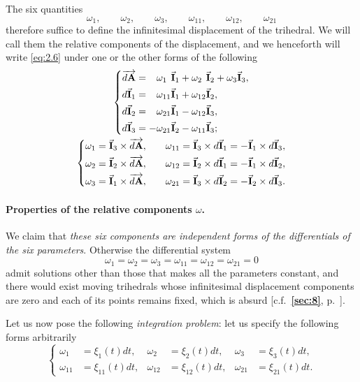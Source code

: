 \documentclass[leqno,11pt]{book}
\numberwithin{equation}{chapter}
\theoremstyle{shape1}
\theoremstyle{shapesmall}
\newcommand{\fsref}[1]{{\rm\textsection\textbf{\ref{sec:#1}}}}
\newcommand{\rvec}[1]{\vec{\mathbf{#1}}}
\newcommand{\ivec}{\rvec{I}}
\begin{document}
The six quantities
\[
\omega_{1},\qquad\omega_{2},\qquad\omega_{3},\qquad\omega_{11},\qquad\omega_{12},\qquad\omega_{21}
\]
therefore suffice to define the infinitesimal displacement of the trihedral. We will call them the relative components of the displacement, and we henceforth will write \eqref{eq:2.6} under one or the other forms of the following
\begin{gather}
  \label{eq:2.7}
  \left\{
    \begin{aligned}
      \overrightarrow{d\mathbf{A}}&={}\hphantom{+}\omega_{1\hphantom{0}}\ivec_{1}+\omega_{2\hphantom{0}}\ivec_{2}+\omega_{3}\ivec_{3},\\
      d\ivec_{1}&={}\hphantom{+}\omega_{11}\ivec_{1}+\omega_{12}\ivec_{2},\\
      d\ivec_{2}&={}\hphantom{+}\omega_{21}\ivec_{1}-\omega_{12}\ivec_{3},\\
      d\ivec_{3}&=-\omega_{21}\ivec_{2}-\omega_{11}\ivec_{3};
    \end{aligned}
  \right.  \\
  \label{eq:2.8}
  \left\{
    \begin{aligned}
      \omega_{1}&=\ivec_{3}\times\overrightarrow{d\mathbf{A}},&&&\omega_{11}&=\ivec_{3}\times d\ivec_{1}=-\ivec_{1}\times d\ivec_{3},\\
      \omega_{2}&=\ivec_{2}\times\overrightarrow{d\mathbf{A}},&&&\omega_{12}&=\ivec_{2}\times d\ivec_{1}=-\ivec_{1}\times d\ivec_{2},\\
      \omega_{3}&=\ivec_{1}\times\overrightarrow{d\mathbf{A}},&&&\omega_{21}&=\ivec_{3}\times d\ivec_{2}=-\ivec_{2}\times d\ivec_{3}.
    \end{aligned}
  \right.
\end{gather}

\paragraph{Properties of the relative components $\omega$.}
\label{sec:25}
We claim that \emph{these six components are independent forms of the differentials of the six parameters}. Otherwise the differential system
\[
\omega_{1}=\omega_{2}=\omega_{3}=\omega_{11}=\omega_{12}=\omega_{21}=0
\]
admit solutions other than those that makes all the parameters constant, and there would exist moving trihedrals whose infinitesimal displacement components are zero and each of its points remains fixed, which is absurd [c.f.~\fsref{8}, p.~\pageref{sec:8}].

Let us now pose the following \emph{integration problem}: let us specify the following forms arbitrarily
\begin{equation}
  \label{eq:2.9}
  \left\{
    \begin{aligned}
      \omega_{1}&=\xi_{1}(t)dt,&\omega_{2}&=\xi_{2}(t)dt,&\omega_{3}&=\xi_{3}(t)dt,\\
      \omega_{11}&=\xi_{11}(t)dt,&\omega_{12}&=\xi_{12}(t)dt,&\omega_{21}&=\xi_{21}(t)dt.
    \end{aligned}
  \right.
\end{equation}
\end{document}
